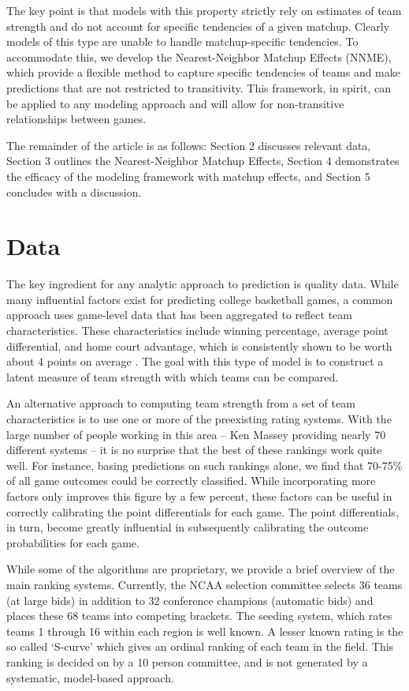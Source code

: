 \documentclass[letterpaper,12pt]{article}
\begin{document}
The key point is that models with this property strictly rely on estimates of team strength and do not account for specific tendencies of a given matchup. Clearly models of this type are unable to handle matchup-specific tendencies. To accommodate this, we develop the Nearest-Neighbor Matchup Effects (NNME), which provide a flexible method to capture specific tendencies of teams and make predictions that are not restricted to transitivity. This framework, in spirit, can be applied to any modeling approach and will allow for non-transitive relationships between games.

The remainder of the article is as follows: Section 2 discusses relevant data, Section 3 outlines the Nearest-Neighbor Matchup Effects, Section 4 demonstrates the efficacy of the modeling framework with matchup effects, and Section 5 concludes with a discussion.
\section{Data}
The key ingredient for any analytic approach to prediction is quality data. While many influential factors exist for predicting college basketball games, a common approach uses game-level data that has been aggregated to reflect team characteristics. These characteristics include winning percentage, average point differential, and home court advantage, which is consistently shown to be worth about 4 points on average \citep{harville1994}. The goal with this type of model is to construct a latent measure of team strength with which teams can be compared. 

An alternative approach to computing team strength from a set of team characteristics is to use one or more of the preexisting rating systems. With the large number of people working in this area -- Ken Massey \citep{kenmassey.com} providing nearly 70 different systems -- it is no surprise that the best of these rankings work quite well. For instance, basing predictions on such rankings alone, we find that 70-75\% of all game outcomes could be correctly classified. While incorporating more factors only improves this figure by a few percent, these factors can be useful in correctly calibrating the point differentials for each game. The point differentials, in turn, become greatly influential in subsequently calibrating the outcome probabilities for each game.

While some of the algorithms are proprietary, we provide a brief overview of the main ranking systems. Currently, the NCAA selection committee selects 36 teams (at large bids) in addition to 32 conference champions (automatic bids) and places these 68 teams into competing brackets. The seeding system, which rates teams 1 through 16 within each region is well known. A lesser known rating is the so called `S-curve' which gives an ordinal ranking of each team in the field. This ranking is decided on by a 10 person committee, and is not generated by a systematic, model-based approach. 
\end{document}
